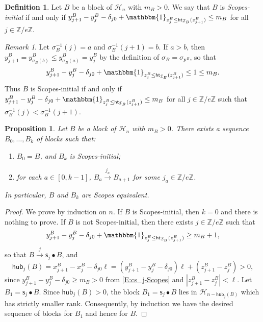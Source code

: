 \documentclass[11pt,a4paper,reqno]{amsart}
\numberwithin{equation}{section}
\theoremstyle{plain}
\newtheorem{prop}[thm]{Proposition}
\theoremstyle{definition}
\newtheorem{Def}[thm]{Definition}
\theoremstyle{remark}
\newtheorem{rem}[thm]{Remark}
\numberwithin{equation}{section}
\newcommand{\bbone}{\mathbbm{1}}
\newcommand{\bl}{\boldsymbol{\lambda}}
\newcommand{\br}{\mathbf{r}}
\newcommand{\by}{\mathbf{y}}
\newcommand{\ZZ}{\mathbb{Z}}
\newcommand{\cs}{\mathsf{s}}
\newcommand{\HH}{\mathcal{H}}
\newcommand{\hub}{\mathsf{hub}}
\newcommand{\PP}{\mathcal{P}}
\newcommand{\DDot}[1]{\mathrel{\overset{#1}{\bullet}}}
\newcommand{\Ht}{\mathsf{ht}}
\newcommand{\II}{\mathcal{I}}
\begin{document}
\begin{Def} \label{D:Scopes-initial}
Let $B$ be a block of $\HH_n$ with $m_B > 0$.
We say that $B$ is {\em Scopes-initial} if and only if
$y^B_{j+1} - y^B_j - \delta_{j0} + \bbone_{z^B_{j} \leq \Ht_{\II_B}(z^B_{j+1})} \leq m_B$
for all $j \in \ZZ/e\ZZ$.
\end{Def}

\begin{rem} \label{R:initial}
Let $\sigma_B^{-1}(j) = a$ and $\sigma_B^{-1}(j+1) = b$.
If $a > b$, then $y^B_{j+1} = y^B_{\sigma_B(b)} \leq y^B_{\sigma_B(a)} = y^B_j$ by the definition of $\sigma_B = \sigma_{\by^B}$, so that
$$
y^B_{j+1} - y^B_j - \delta_{j0} + \bbone_{z^B_{j} \leq \Ht_{\II_B}(z^B_{j+1})} \leq 1 \leq m_B.
$$
Thus $B$ is Scopes-initial if and only if $y^B_{j+1} - y^B_j - \delta_{j0} + \bbone_{z^B_{j} \leq \Ht_{\II_B}(z^B_{j+1})} \leq m_B$ for all $j \in \ZZ/e\ZZ$ such that $\sigma^{-1}_B(j) < \sigma_B^{-1}(j+1)$.
\end{rem}

\begin{prop} \label{P:Scopes}
Let $B$ be a block of $\HH_n$ with $m_B > 0$.
There exists a sequence $B_0, \dotsc, B_k$ of blocks such that:
\begin{enumerate}
\item $B_0 = B$, and $B_k$ is Scopes-initial;
\item for each $a \in [0, k-1]$, $B_a \xrightarrow{j_a} B_{a+1}$ for some $j_a \in \ZZ/e\ZZ$.%
\end{enumerate}
In particular, $B$ and $B_k$ are Scopes equivalent.
\end{prop}

\begin{proof}
We prove by induction on $n$.
If $B$ is Scopes-initial, then $k=0$ and there is nothing to prove.
If $B$ is not Scopes-initial,
then there exists $j \in \ZZ/e\ZZ$ such that
\begin{equation} \label{E:cs_j-Scopes}
y^B_{j+1} - y^B_j - \delta_{j0} + \bbone_{z^B_{j} \leq \Ht_{\II_B}(z^B_{j+1})} \geq m_B + 1,
\end{equation}
so that $B \xrightarrow{j} \cs_j \DDot{} B$, 
and
$$
\hub_j(B) = x^B_{j+1} - x^B_j - \delta_{j0} \ell
= (y^B_{j+1} - y^B_j - \delta_{j0})\ell + (z^B_{j+1} - z^B_j)
>0,
$$
since $y^B_{j+1} - y^B_j - \delta_{j0} \geq m_B > 0$ from \eqref{E:cs_j-Scopes} and $|z^B_{j+1} - z^B_j| < \ell$.
Let %
$B_1 = \cs_j \DDot{} B$.
Since $\hub_j(B) >0$, the block $B_1 = \cs_j \DDot{} B$ lies in $\HH_{n-\hub_j(B)}$ which has strictly smaller rank.  Consequently, by induction we have the desired sequence of blocks for $B_1$ and hence for $B$.
\end{proof}
\end{document}
